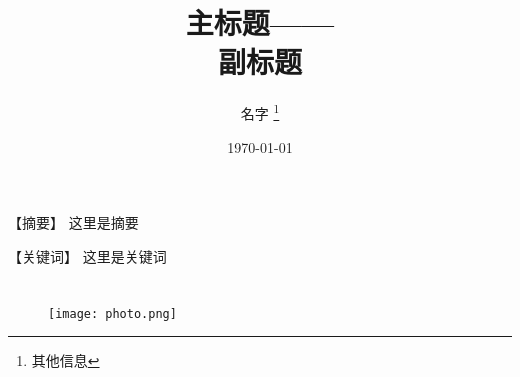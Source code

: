 \documentclass[12pt, oneside, a4paper]{ctexart}
\title{\textbf{主标题—— \\ \large 副标题}}
\author{名字 \thanks{其他信息}}
\date{\today}
\begin{document}
\pagestyle{empty} %
\maketitle

\noindent
\begin{flushleft}
  \setlength{\parindent}{0pt}
  \small
  {\heiti【摘要】} 这里是摘要
  \par
  {\heiti【关键词】} 这里是关键词
  \normalsize
\end{flushleft}

\section{\textbf{}}

\begin{figure}[H]
  \centering
  \texttt{[image: photo.png]}
  \caption{}
  \label{fig:1}
\end{figure}


\end{document}

